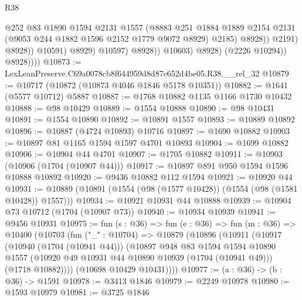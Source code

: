 \begin{lexlean}{R38}
\begin{coremodule}
                                      @252
                                      @83
                                      @1890
                                      @1594
                                      @2131
                                      @1557
                                      (@8883
                                        @251
                                        @1884
                                        @1889
                                        @2154
                                        @2131
                                        (@9053 @244 @1882 @1596 @2152 @1779 @9072 @8929)
                                        @2185)
                                      @8928))
                                  @2191)
                                @8928))
                            @10591)
                          @8929)
                        @10597)
                      @8928))
                  @10603)
                @8928)
              (@2226 @10294))
            @8928))))
@10873 := LexLeanPreserve.C69a0078cb8f644959d8d87c652d4be05.R38.__rel_32
@10879 := @10717 (@10872 (@10873 @4046 @1846 @5178 @10351))
@10882 := @1641 (@5577 @10712) @5887
@10887 := @1768 @10882 @1135 @1166 @1730 @10432
@10888 := @98 @10429
@10889 := @1554 @10888
@10890 := @98 @10431
@10891 := @1554 @10890
@10892 := @10891 @1557
@10893 := @10889 @10892
@10896 := @10887 (@4724 @10893) @10716
@10897 := @1690 @10882
@10903 := @10897 @81 @1165 @1594 @1597 @4701 @10893
@10904 := @1699 @10882
@10906 := @10904 @44 @4701
@10907 := @1705 @10882
@10911 := @10903 (@10906 (@1704 (@10907 @44)))
@10917 := @10897 @891 @950 @1594 @1596 @10888 @10892
@10920 := @9436 @10882 @112 @1594
@10921 := @10920 @44
@10931 := @10889 (@10891 (@1554 (@98 (@1577 @10428)) (@1554 (@98 (@1581 @10428)) @1557)))
@10934 := @10921 @10931 @44 @10888
@10939 := @10904 @73 @10712 (@1704 (@10907 @73))
@10940 := @10934 @10939
@10941 := @9456 @10931
@10975 := fun (s : @36) =>
  fun (e : @36) =>
  fun (m : @36) =>
  @10400
    (@10703
      (fun ("_" : @10704) =>
      @10879
        (@10896
          (@10911
            (@10917
              (@10940 (@1704 (@10941 @44)))
              (@10897
                @948
                @83
                @1594
                @1594
                @10890
                @1557
                (@10920 @49 @10931 @44 @10890 @10939 (@1704 (@10941 @49)))
                (@1718 @10882))))
          (@10698 @10429 @10431))))
@10977 := (a : @36) -> (b : @36) -> @1591
@10978 := @3413 @1846
@10979 := @2249 @10978
@10980 := @1593 @10979
@10981 := @3725 @1846

\end{coremodule}
\end{lexlean}
